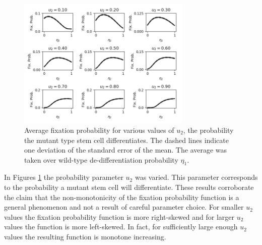 \documentclass[12pt]{article}
\begin{document}
\begin{figure}[H]
\begin{center}
\includegraphics[width=0.74\textwidth]{avg_eta1_u2_stackplot.png}
\end{center}
\caption{Average fixation probability for various values of $u_2$, the probability the mutant type stem cell differentiates. The dashed lines indicate one deviation of the standard error of the mean. The average was taken over wild-type de-differentiation probability $\eta_1$.}\label{u2_stack}
\end{figure}

In Figures \ref{u2_stack} the probability parameter $u_2$ was varied. This parameter corresponds to the probability a mutant stem cell will differentiate. These results corroborate the claim that the non-monotonicity of the fixation probability function is a general phenomenon and not a result of careful parameter choice. For smaller $u_2$ values the fixation probability function is more right-skewed and for larger $u_2$ values the function is more left-skewed. In fact, for sufficiently large enough $u_2$ values the resulting function is monotone increasing. 
\end{document}
